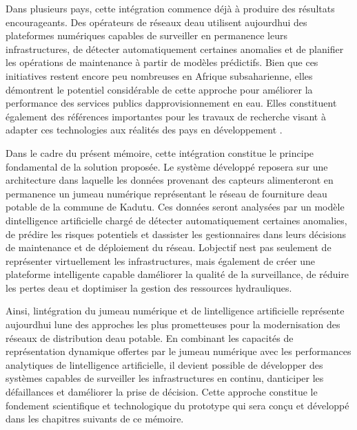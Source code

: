 \documentclass[12pt,a4paper,oneside]{report}
\begin{document}
Dans plusieurs pays, cette intégration commence déjà à produire des
résultats encourageants. Des opérateurs de réseaux d\textquotesingle eau
utilisent aujourd\textquotesingle hui des plateformes numériques
capables de surveiller en permanence leurs infrastructures, de détecter
automatiquement certaines anomalies et de planifier les opérations de
maintenance à partir de modèles prédictifs. Bien que ces initiatives
restent encore peu nombreuses en Afrique subsaharienne, elles démontrent
le potentiel considérable de cette approche pour améliorer la
performance des services publics d\textquotesingle approvisionnement en
eau. Elles constituent également des références importantes pour les
travaux de recherche visant à adapter ces technologies aux réalités des
pays en développement \cite{ref74}.

Dans le cadre du présent mémoire, cette intégration constitue le
principe fondamental de la solution proposée. Le système développé
reposera sur une architecture dans laquelle les données provenant des
capteurs alimenteront en permanence un jumeau numérique représentant le
réseau de fourniture d\textquotesingle eau potable de la commune de
Kadutu. Ces données seront analysées par un modèle
d\textquotesingle intelligence artificielle chargé de détecter
automatiquement certaines anomalies, de prédire les risques potentiels
et d\textquotesingle assister les gestionnaires dans leurs décisions de
maintenance et de déploiement du réseau. L\textquotesingle objectif
n\textquotesingle est pas seulement de représenter virtuellement les
infrastructures, mais également de créer une plateforme intelligente
capable d\textquotesingle améliorer la qualité de la surveillance, de
réduire les pertes d\textquotesingle eau et d\textquotesingle optimiser
la gestion des ressources hydrauliques.

Ainsi, l\textquotesingle intégration du jumeau numérique et de
l\textquotesingle intelligence artificielle représente
aujourd\textquotesingle hui l\textquotesingle une des approches les plus
prometteuses pour la modernisation des réseaux de distribution
d\textquotesingle eau potable. En combinant les capacités de
représentation dynamique offertes par le jumeau numérique avec les
performances analytiques de l\textquotesingle intelligence artificielle,
il devient possible de développer des systèmes capables de surveiller
les infrastructures en continu, d\textquotesingle anticiper les
défaillances et d\textquotesingle améliorer la prise de décision. Cette
approche constitue le fondement scientifique et technologique du
prototype qui sera conçu et développé dans les chapitres suivants de ce
mémoire.
\end{document}
